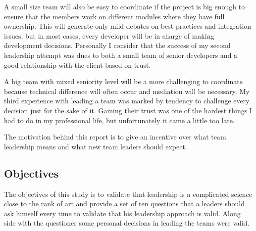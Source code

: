 A small size team will also be easy to coordinate if the project is big enough to ensure that the members work on different modules where they have full ownership. This will generate only mild debates on best practices and integration issues, but in most cases, every developer will be in charge of making development decisions. Personally I consider that the success of my second leadership attempt was dues to both a small team of senior developers and a good relationship with the client based on trust.

A big team with mixed seniority level will be a more challenging to coordinate because technical difference will often occur and mediation will be necessary. My third experience with leading a team was marked by tendency to challenge every decision just for the sake of it. Gaining their trust was one of the hardest things I had to do in my professional life, but unfortunately it came a little too late. 

The motivation behind this report is to give an incentive over what team leadership means and what new team leaders should expect.

\subsection{Objectives}
\label{sub-sec:objectives}

The objectives of this study is to validate that leadership is a complicated science close to the rank of art and provide a set of ten questions that a leaders should ask himself every time to validate that his leadership approach is valid. 
Along side with the questioner some personal decisions in leading the teams were valid.